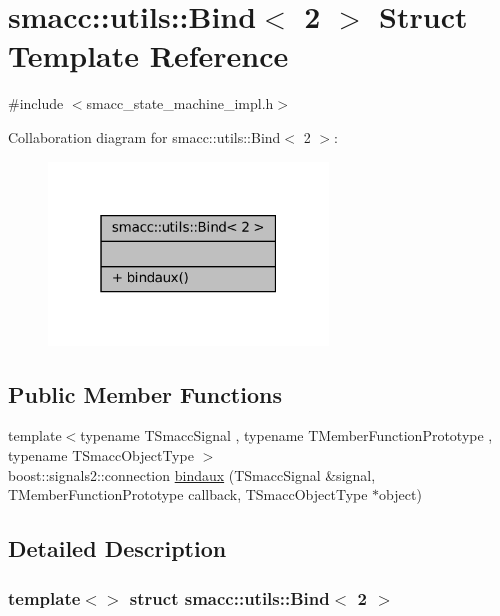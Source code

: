 \hypertarget{structsmacc_1_1utils_1_1Bind_3_012_01_4}{}\section{smacc\+:\+:utils\+:\+:Bind$<$ 2 $>$ Struct Template Reference}
\label{structsmacc_1_1utils_1_1Bind_3_012_01_4}


{\ttfamily \#include $<$smacc\+\_\+state\+\_\+machine\+\_\+impl.\+h$>$}



Collaboration diagram for smacc\+:\+:utils\+:\+:Bind$<$ 2 $>$\+:
\nopagebreak
\begin{figure}[H]
\begin{center}
\leavevmode
\includegraphics[width=211pt]{structsmacc_1_1utils_1_1Bind_3_012_01_4__coll__graph}
\end{center}
\end{figure}
\subsection*{Public Member Functions}
\begin{DoxyCompactItemize}
\item 
{\footnotesize template$<$typename T\+Smacc\+Signal , typename T\+Member\+Function\+Prototype , typename T\+Smacc\+Object\+Type $>$ }\\boost\+::signals2\+::connection \hyperlink{structsmacc_1_1utils_1_1Bind_3_012_01_4_aa9bba43cc8862f00155b17d2625bd99e}{bindaux} (T\+Smacc\+Signal \&signal, T\+Member\+Function\+Prototype callback, T\+Smacc\+Object\+Type $\ast$object)
\end{DoxyCompactItemize}


\subsection{Detailed Description}
\subsubsection*{template$<$$>$\newline
struct smacc\+::utils\+::\+Bind$<$ 2 $>$}



